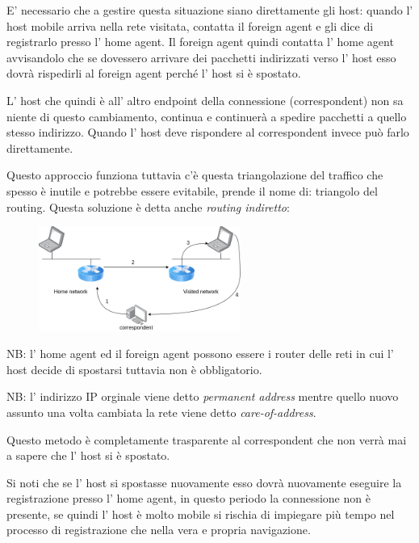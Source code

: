 E' necessario che a gestire questa situazione siano direttamente gli host: quando l' host mobile arriva nella rete visitata, contatta il foreign agent e gli dice di registrarlo presso l' home agent.
Il foreign agent quindi contatta l' home agent avvisandolo che se dovessero arrivare dei pacchetti indirizzati verso l' host esso dovrà rispedirli al foreign agent perché l' host si è spostato.

L' host che quindi è all' altro endpoint della connessione (correspondent) non sa niente di questo cambiamento, continua e continuerà a spedire pacchetti a quello stesso indirizzo.
Quando l' host deve rispondere al correspondent invece può farlo direttamente.

Questo approccio funziona tuttavia c'è questa triangolazione del traffico che spesso è inutile e potrebbe essere evitabile, prende il nome di: triangolo del routing.
Questa soluzione è detta anche \emph{routing indiretto}:
\begin{figure}[H]
    \centering
    \includegraphics[width=250px]{images/8_Wireless_Mobile/indirect_routing.png}
\end{figure}
NB: l' home agent ed il foreign agent possono essere i router delle reti in cui l' host decide di spostarsi tuttavia non è obbligatorio.

NB: l' indirizzo IP orginale viene detto \emph{permanent address} mentre quello nuovo assunto una volta cambiata la rete viene detto \emph{care-of-address}.

Questo metodo è completamente trasparente al correspondent che non verrà mai a sapere che l' host si è spostato.

Si noti che se l' host si spostasse nuovamente esso dovrà nuovamente eseguire la registrazione presso l' home agent, in questo periodo la connessione non è presente, se quindi l' host è molto mobile si rischia di impiegare più tempo nel processo di registrazione che nella vera e propria navigazione.

